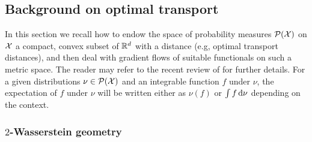 \subsection{Background on optimal transport}

In this section we recall how to endow the space of probability measures $\mathcal{P}({{\mathcal X}})$ on ${{\mathcal X}}$ a compact, convex subset of ${{\mathbb R}}^d$ with a distance (e.g, optimal transport distances), and then deal with gradient flows of suitable functionals on such a metric space. The reader may refer to the recent review of \cite{santambrogio2017euclidean} for further details. For a given distributions $\nu\in\mathcal{P}({{\mathcal X}})$ and an integrable function $f$ under $\nu$, the expectation of $f$ under $\nu$ will be written either as $\nu(f)$ or $\int f \mathop{}\!\mathrm{d}\nu$ depending on the context. 

\subsubsection{$2$-Wasserstein geometry}\label{subsec:wasserstein_flow}


